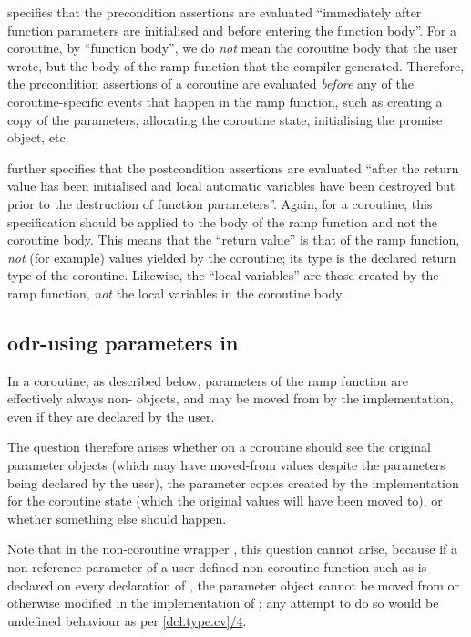\cite{P2900R8} specifies that the precondition assertions are evaluated ``immediately after function parameters are initialised and before entering the function body''. For a coroutine, by ``function body'', we do \emph{not} mean the coroutine body that the user wrote, but the body of the ramp function that the compiler generated. Therefore, the precondition assertions of a coroutine are evaluated \emph{before} any of the coroutine-specific events that happen in the ramp function, such as creating a copy of the parameters, allocating the coroutine state, initialising the promise object, etc.

\cite{P2900R8} further specifies that the postcondition assertions are evaluated ``after the return value has been initialised and local automatic variables have been destroyed but prior to the destruction of function parameters''. Again, for a coroutine, this specification should be applied to the body of the ramp function and not the coroutine body. This means that the ``return value'' is that of the ramp function, \emph{not} (for example) values yielded by the coroutine; its type is the declared return type of the coroutine. Likewise, the ``local variables'' are those created by the ramp function, \emph{not} the local variables in the coroutine body.

\subsection{odr-using parameters in }
\label{paramsinpost}

In a coroutine, as described below, parameters of the ramp function are effectively always non- objects, and may be moved from by the implementation, even if they are declared  by the user.

The question therefore arises whether  on a coroutine should see the original parameter objects (which may have moved-from values despite the parameters being declared  by the user), the parameter copies created by the implementation for the coroutine state (which the original values will have been moved to), or whether something else should happen.

Note that in the non-coroutine wrapper , this question cannot arise, because if a non-reference parameter of a user-defined non-coroutine function such as  is declared  on every declaration of , the parameter object cannot be moved from or otherwise modified in the implementation of ; any attempt to do so would be undefined behaviour as per \href{https://eel.is/c++draft/dcl.type.cv#4.sentence-1}{[dcl.type.cv]/4}.


